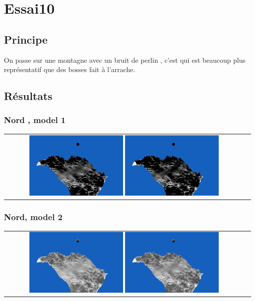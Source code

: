 \documentclass[a4paper]{article}
\begin{document}
\section{Essai10}
\subsection{Principe}
On passe sur une montagne avec un bruit de perlin , c'est qui est beaucoup plus représentatif que des bosses fait à l'arrache.
\subsection{Résultats} 
\subsubsection{Nord , model 1}
\begin{tabular}{cc}
\includegraphics[width=0.4\textwidth]{Images/Essais/Essai_10_phong_North_0.png}
\includegraphics[width=0.4\textwidth]{Images/Essais/Essai_10_slint_North_0.png}
\end{tabular}

\subsubsection{Nord, model 2}
\begin{tabular}{cc}
\includegraphics[width=0.4\textwidth]{Images/Essais/Essai_10_phong_North_1.png}
\includegraphics[width=0.4\textwidth]{Images/Essais/Essai_10_slint_North_1.png}
\end{tabular}
\end{document}
